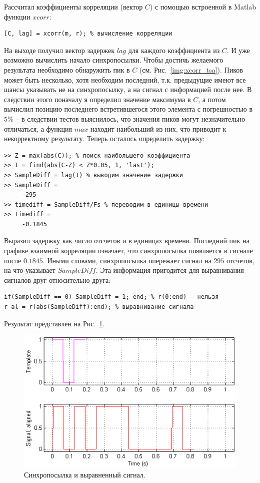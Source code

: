 \documentclass[12pt,a4paper]{article}
\begin{document}
Рассчитал коэффициенты корреляции (вектор $C$) с помощью встроенной в Matlab функции $xcorr$:
\begin{verbatim}
[C, lag] = xcorr(m, r); % вычисление корреляции
\end{verbatim}
На выходе получил вектор задержек $lag$ для каждого коэффициента из $C$. И уже возможно вычислить начало синхропосылки. Чтобы достичь желаемого результата необходимо обнаружить пик в $C$ (см. Рис.~\ref{img:xcorr_tsa}). Пиков может быть несколько, хотя необходим последний, т.к. предыдущие имеют все шансы указывать не на синхропосылку, а на сигнал с информацией после нее. В следствии этого поначалу я определил значение максимума в $C$, а потом вычислил позицию последнего встретившегося этого элемента с погрешностью в $5\%$ -- в следствии тестов выяснилось, что значения пиков могут незначительно отличаться, а функция $max$ находит наибольший из них, что приводит к некорректному результату. Теперь осталось определить задержку:
\begin{verbatim}
>> Z = max(abs(C)); % поиск наибольшего коэффициента
>> I = find(abs(C-Z) < Z*0.05, 1, 'last');
>> SampleDiff = lag(I) % выводим значение задержки
>> SampleDiff =
     -295
>> timediff = SampleDiff/Fs % переводим в единицы времени
>> timediff =
     -0.1845
\end{verbatim}
Выразил задержку как число отсчетов и в единицах времени. Последний пик на графике взаимной корреляции означает, что синхропосылка появляется в сигнале после $0.1845$. Иными словами, синхропосылка опережает сигнал на $295$ отсчетов, на что указывает $SampleDiff$. Эта информация пригодится для выравнивания сигналов друг относительно друга:
\begin{verbatim}
if(SampleDiff == 0) SampleDiff = 1; end; % r(0:end) - нельзя
r_al = r(abs(SampleDiff):end); % выравнивание сигнала
\end{verbatim}
Результат представлен на Рис.~\ref{img:xcorr_ts}.
\begin{figure}[H]
\includegraphics[width=\linewidth]{xcorr_ts}
\caption{Синхропосылка и выравненный сигнал.}
\label{img:xcorr_ts}
\end{figure}
\end{document}
